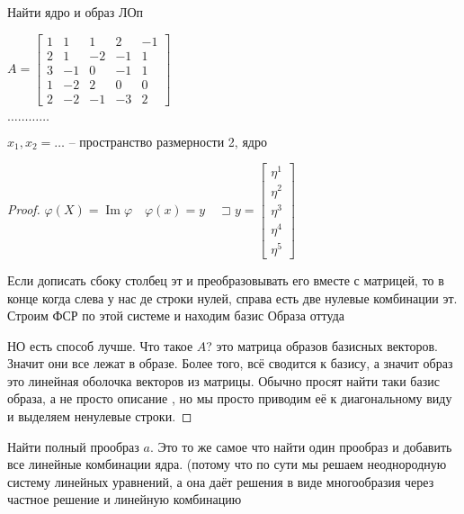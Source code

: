 \documentclass{book}
\DeclareMathOperator{\Image}{Im}
\theoremstyle{definition}
\begin{document}
\begin{problem}
    Найти ядро и образ ЛОп

    $A = \begin{bmatrix} 1&1&1&2&-1\\2&1&-2&-1&1\\3&-1&0&-1&1\\1&-2&2&0&0\\2&-2&-1&-3&2 \end{bmatrix} $

    $\ldots\ldots\ldots\ldots$

    $x_1, x_2 = \ldots$ -- пространство размерности 2, ядро
\end{problem}
\begin{proof}
    $\varphi(X) = \Image \varphi\quad \varphi(x) = y\quad \sqsupset y = \begin{bmatrix} \eta^1\\ \eta^2 \\ \eta^3 \\ \eta^4 \\ \eta^5 \end{bmatrix} $

     Если дописать сбоку столбец эт и преобразовывать его вместе с матрицей, то в конце когда слева у нас де строки нулей, справа есть две нулевые комбинации эт. Строим ФСР по этой системе и находим базис Образа оттуда

     НО есть способ лучше. Что такое $A$? это матрица образов базисных векторов. Значит они все лежат в образе. Более того, всё сводится к базису, а значит образ это линейная оболочка векторов из матрицы. Обычно просят найти таки базис образа, а не просто описание , но мы просто приводим её к диагональному виду и выделяем ненулевые строки.
\end{proof}

\begin{problem}
    Найти полный прообраз $a$. Это то же самое что найти один прообраз и добавить все линейные комбинации ядра. (потому что по сути мы решаем неоднородную систему линейных уравнений, а она даёт решения в виде многообразия через частное решение и линейную комбинацию
\end{problem}
\end{document}
